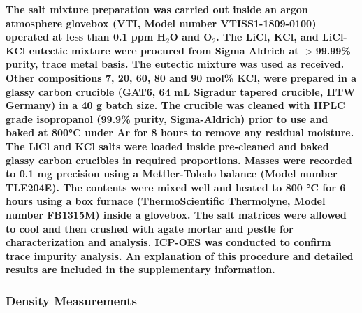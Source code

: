 \documentclass[review]{elsarticle}
\providecommand{\DIFaddtex}[1]{{\bf #1}} %
\providecommand{\DIFadd}[1]{\texorpdfstring{\DIFaddtex{#1}}{#1}} %
\begin{document}
\DIFadd{The salt mixture preparation was carried out inside an argon atmosphere glovebox (VTI, Model number VTISS1-1809-0100) operated at less than 0.1 ppm H$_{2}$O and O$_{2}$. The LiCl, KCl, and LiCl-KCl eutectic mixture were procured from Sigma Aldrich at $>$99.99\% purity, trace metal basis. The eutectic mixture was used as received. Other compositions 7, 20, 60, 80 and 90 mol\% KCl, were prepared in a glassy carbon crucible (GAT6, 64 mL Sigradur tapered crucible, HTW Germany) in a 40 g batch size. The crucible was cleaned with HPLC grade isopropanol (99.9\% purity, Sigma-Aldrich) prior to use and baked at 800°C under Ar for 8 hours to remove any residual moisture. The LiCl and KCl salts were loaded inside pre-cleaned and baked glassy carbon crucibles in required proportions. Masses were recorded to 0.1 mg precision using a Mettler-Toledo balance (Model number TLE204E). The contents were mixed well and heated to 800 °C for 6 hours using a box furnace (ThermoScientific Thermolyne, Model number FB1315M) inside a glovebox. The salt matrices were allowed to cool and then crushed with agate mortar and pestle for characterization and analysis. ICP-OES was conducted to confirm trace impurity analysis. An explanation of this procedure and detailed results are included in the supplementary information. 
}

\subsubsection{\DIFadd{Density Measurements}} 
\end{document}
